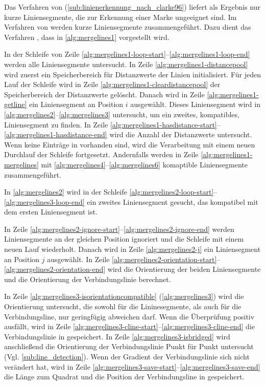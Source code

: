 Das Verfahren von \citeauthor{clarke96} (\autoref{sub:linienerkennung_nach_clarke96}) liefert als Ergebnis nur kurze
 Liniensegmente, die zur Erkennung einer Marke ungeeignet sind. Im Verfahren von \citeauthor{hirzer08} werden kurze
 Liniensegmente zusammengeführt. Dazu dient das Verfahren , dass in \autoref{alg:mergelines1}
 vorgestellt wird.



In der Schleife von Zeile \ref{alg:mergelines1-loop-start}--\ref{alg:mergelines1-loop-end} werden alle Liniensegmente
 untersucht. In Zeile \ref{alg:mergelines1-distancepool} wird zuerst ein Speicherbereich für Distanzwerte der Linien
 initialisiert. Für jeden Lauf der Schleife wird in Zeile \ref{alg:mergelines1-cleardistancepool} der Speicherbereich
 der Distanzwerte gelöscht. Danach wird in Zeile \ref{alg:mergelines1-getline} ein Liniensegment an Position $i$
 ausgewählt. Dieses Liniensegment wird in \autoref{alg:mergelines2}--\autoref{alg:mergelines3} untersucht, um ein
 zweites, kompatibles, Liniensegment zu finden. In Zeile
 \ref{alg:mergelines1-hasdistance-start}--\ref{alg:mergelines1-hasdistance-end} wird die Anzahl der Distanzwerte
 untersucht. Wenn keine Einträge in  vorhanden sind, wird die Verarbeitung mit einem neuen
 Durchlauf der Schleife fortgesetzt. Andernfalls werden in Zeile \ref{alg:mergelines1-mergelines} mit
 \autoref{alg:mergelines4}--\autoref{alg:mergelines6} komaptible Liniensegmente zusammengeführt.

In \autoref{alg:mergelines2} wird in der Schleife \ref{alg:mergelines2-loop-start}--\ref{alg:mergelines3-loop-end} ein
 zweites Liniensegment gesucht, das kompatibel mit dem ersten Liniensegment ist.



In Zeile \ref{alg:mergelines2-ignore-start}--\ref{alg:mergelines2-ignore-end} werden Liniensegmente an der gleichen
 Position ignoriert und die Schleife mit einem neuen Lauf wiederholt. Danach wird in Zeile \ref{alg:mergelines2-j} ein
 Liniensegment an Position $j$ ausgewählt. In Zeile
 \ref{alg:mergelines2-orientation-start}--\ref{alg:mergelines2-orientation-end} wird die Orientierung der beiden
 Liniensegmente und die Orientierung der Verbindungslinie berechnet.

In Zeile \ref{alg:mergelines3-isorientationcompatible} (\autoref{alg:mergelines3}) wird die Orientierung untersucht,
 die sowohl für die Lininesegmente, als auch für die Verbindungsline, nur geringfügig abweichen darf. Wenn die
 Überprüfung positiv ausfällt, wird in Zeile \ref{alg:mergelines3-cline-start}--\ref{alg:mergelines3-cline-end} die
 Verbindungslinie in  gespeichert. In Zeile \ref{alg:mergelines3-isbridged} wird anschließend die
 Orientierung der Verbindungslinie Punkt für Punkt untersucht (Vgl. \autoref{sub:line_detection}). Wenn der Gradient
 der Verbindungslinie sich nicht verändert hat, wird in Zeile
 \ref{alg:mergelines3-save-start}--\ref{alg:mergelines3-save-end} die Länge zum Quadrat und die Position der
 Verbindungsline in  gespeichert.


